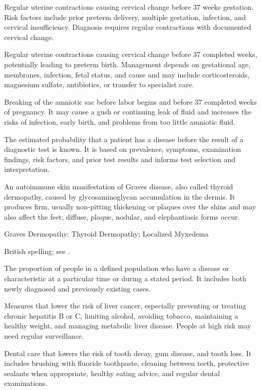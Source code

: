  Regular uterine contractions causing cervical change before 37 weeks gestation. Risk
factors include prior preterm delivery, multiple gestation, infection, and cervical
insufficiency. Diagnosis requires regular contractions with documented cervical change.

 Regular uterine contractions causing cervical change before 37 completed weeks, potentially leading to preterm birth. Management depends on gestational age, membranes, infection, fetal status, and cause and may include corticosteroids, magnesium sulfate, antibiotics, or transfer to specialist care.

 Breaking of the amniotic sac before labor begins and before 37 completed weeks of pregnancy. It may cause a gush or continuing leak of fluid and increases the risks of infection, early birth, and problems from too little amniotic fluid.

 The estimated probability that a patient has a disease before the result of a diagnostic
test is known. It is based on prevalence, symptoms, examination findings, risk factors,
and prior test results and informs test selection and interpretation.

 An autoimmune skin manifestation of Graves disease, also called thyroid dermopathy, caused by glycosaminoglycan accumulation in the dermis. It produces firm, usually non-pitting thickening or plaques over the shins and may also affect the feet; diffuse, plaque, nodular, and elephantiasic forms occur.

\synonyms
Graves Dermopathy; Thyroid Dermopathy; Localized Myxedema

 British spelling; see .

 The proportion of people in a defined population who have a disease or characteristic at a particular time or during a stated period. It includes both newly diagnosed and previously existing cases.

 Measures that lower the risk of liver cancer, especially preventing or treating chronic hepatitis B or C, limiting alcohol, avoiding tobacco, maintaining a healthy weight, and managing metabolic liver disease. People at high risk may need regular surveillance.

 Dental care that lowers the risk of tooth decay, gum disease, and tooth loss. It includes brushing with fluoride toothpaste, cleaning between teeth, protective sealants when appropriate, healthy eating advice, and regular dental examinations.

